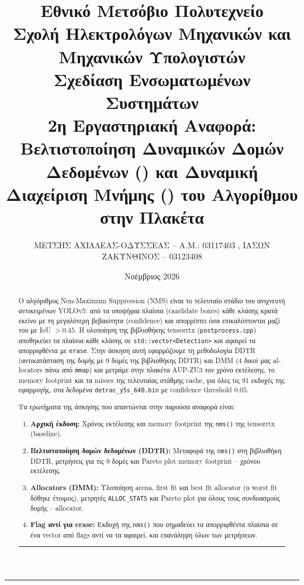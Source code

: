 \documentclass[11pt,a4paper]{article}
\title{
    \textbf{Εθνικό Μετσόβιο Πολυτεχνείο}\\
    \large Σχολή Ηλεκτρολόγων Μηχανικών και Μηχανικών Υπολογιστών\\
    \vspace{0.3cm}
    \textbf{Σχεδίαση Ενσωματωμένων Συστημάτων}\\
    \vspace{0.2cm}
    \Large 2η Εργαστηριακή Αναφορά: Βελτιστοποίηση Δυναμικών Δομών Δεδομένων (\en{DDTR}) και Δυναμική Διαχείριση Μνήμης (\en{DMM}) του Αλγορίθμου \en{NMS} στην Πλακέτα \en{AUP-ZU3}
}
\author{ΜΕΤΣΗΣ ΑΧΙΛΛΕΑΣ-ΟΔΥΣΣΕΑΣ -- Α.Μ.: 03117403 , ΙΑΣΩΝ ΖΑΚΥΝΘΙΝΟΣ -- 03123408}
\date{Νοέμβριος 2026}
\newcommand{\en}[1]{\textlatin{#1}}
\begin{document}
\maketitle

\hrule
\vspace{0.4cm}

\begin{abstract}
Ο αλγόριθμος \en{Non-Maximum Suppression (NMS)} είναι το τελευταίο στάδιο του ανιχνευτή αντικειμένων \en{YOLOv5}: από τα υποψήφια πλαίσια (\en{candidate boxes}) κάθε κλάσης κρατά εκείνο με τη μεγαλύτερη βεβαιότητα (\en{confidence}) και απορρίπτει όσα επικαλύπτονται μαζί του με \en{IoU} $> 0.45$. Η υλοποίηση της βιβλιοθήκης \en{tensorrtx} (\en{\texttt{postprocess.cpp}}) αποθηκεύει τα πλαίσια κάθε κλάσης σε \en{\texttt{std::vector<Detection>}} και αφαιρεί τα απορριφθέντα με \en{\texttt{erase}}. Στην άσκηση αυτή εφαρμόζουμε τη μεθοδολογία \en{DDTR} (αντικατάσταση της δομής με 9 δομές της βιβλιοθήκης \en{DDTR}) και \en{DMM} (4 δικοί μας \en{allocators} πάνω από \en{\texttt{mmap}}) και μετράμε στην πλακέτα \en{AUP-ZU3} τον χρόνο εκτέλεσης, το \en{memory footprint} και τα \en{misses} της τελευταίας στάθμης \en{cache}, για όλες τις 91 εκδοχές της εφαρμογής, στα δεδομένα \en{\texttt{detrac\_y5s\_640.bin}} με \en{confidence threshold} $0.05$.

Τα ερωτήματα της άσκησης που απαντώνται στην παρούσα αναφορά είναι:
\begin{enumerate}
    \item \textbf{Αρχική έκδοση:} Χρόνος εκτέλεσης και \en{memory footprint} της \en{\texttt{nms()}} της \en{tensorrtx} (\en{baseline}).
    \item \textbf{Βελτιστοποίηση δομών δεδομένων (\en{DDTR}):} Μεταφορά της \en{\texttt{nms()}} στη βιβλιοθήκη \en{DDTR}, μετρήσεις για τις 9 δομές και \en{Pareto plot} \en{memory footprint} -- χρόνου εκτέλεσης.
    \item \textbf{\en{Allocators} (\en{DMM}):} Υλοποίηση \en{arena}, \en{first fit} και \en{best fit allocator} (ο \en{worst fit} δόθηκε έτοιμος), μετρητές \en{\texttt{ALLOC\_STATS}} και \en{Pareto plot} για όλους τους συνδυασμούς δομής -- \en{allocator}.
    \item \textbf{\en{Flag} αντί για \en{erase}:} Εκδοχή της \en{\texttt{nms()}} που σημαδεύει τα απορριφθέντα πλαίσια σε ένα \en{vector} από \en{flags} αντί να τα αφαιρεί, και επανάληψη όλων των μετρήσεων.
\end{enumerate}

\vspace{0.3cm}
\hrule
\vspace{0.5cm}
\end{abstract}
\end{document}
